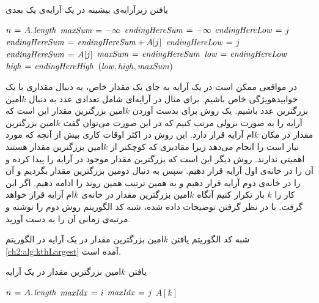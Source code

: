 \begin{algorithm}
\caption{یافتن زیرآرایه‌ی بیشینه‌ در یک آرایه‌ی یک بعدی}\label{ch2:alg:maxSubarray}
\begin{latin}
\begin{algorithmic}[1]
	\State	$n\mathrel{\hspace{1pt}=\hspace{1pt}} A.\hspace*{1pt}\mathit{\mathit{length}}$
	\State	$\mathit{maxSum}\mathrel{\hspace{1pt}=\hspace{1pt}} -\infty$
	\State	$\mathit{endingHereSum}\mathrel{\hspace{1pt}=\hspace{1pt}} -\infty$
		\State	$\mathit{endingHereLow}\mathrel{\hspace{1pt}=\hspace{1pt}} j$
			\State	$\mathit{endingHereSum}\mathrel{\hspace{1pt}=\hspace{1pt}} \mathit{endingHereSum} + A[j]$
		\Else
			\State	$\mathit{endingHereLow}\mathrel{\hspace{1pt}=\hspace{1pt}} j$
			\State	$\mathit{endingHereSum}\mathrel{\hspace{1pt}=\hspace{1pt}} A[j]$
		\EndIf
			\State	$\mathit{maxSum}\mathrel{\hspace{1pt}=\hspace{1pt}} \mathit{endingHereSum}$
			\State	$\mathit{low}\mathrel{\hspace{1pt}=\hspace{1pt}} \mathit{endingHereLow}$
			\State	$\mathit{high}\mathrel{\hspace{1pt}=\hspace{1pt}} \mathit{endingHereHigh}$			
		\EndIf		
	\EndFor
	\State	\Return $(\mathit{low},\mathit{high},\mathit{maxSum})$
\EndFunction
\end{algorithmic}
\end{latin}
\end{algorithm}

 در مواقعی ممکن است در یک آرایه به جای یک مقدار خاص، به دنبال مقداری با یک ‌خوابیده{ویژگی} خاص باشیم. برای مثال در آرایه‌ای شامل تعدادی عدد به دنبال {$k$}امین بزرگترین عدد باشیم. یک روش برای بدست آوردن {$k$}امین بزرگترین مقدار این است که آرایه را به صورت نزولی مرتب کنیم که در این صورت می‌توان گفت {$k$}امین بزرگترین مقدار در مکان {$k$}ام آرایه قرار دارد. این روش در اکثر اوقات کاری بیش از آنچه که مورد نیاز است را انجام می‌دهد زیرا مقادیری که کوچکتر از {$k$}امین بزرگترین مقدار هستند اهمیتی ندارند. روش دیگر این است که بزرگترین مقدار موجود در آرایه را پیدا کرده و  آن را در خانه‌ی اول آرایه قرار دهیم. سپس به دنبال دومین بزرگترین مقدار بگردیم و آن را در خانه‌ی دوم آرایه قرار دهیم و به همین ترتیب همین روند را ادامه دهیم. اگر این کار را {$k$} بار تکرار کنیم آنگاه {$k$}امین بزرگترین مقدار در خانه‌ی {$k$}ام آرایه قرار خواهد گرفت. با در نظر گرفتن توضیحات داده ‌شده، شبه کد الگوریتم روش دوم را نوشته و مرتبه‌ی زمانی آن را به دست آورید.


شبه کد الگوریتم یافتن {$k$}امین بزرگترین مقدار در یک آرایه در الگوریتم {\ref{ch2:alg:kthLargest}} آمده است.

\begin{algorithm}
\caption{یافتن {$k$}امین بزرگترین مقدار در یک آرایه}\label{ch2:alg:kthLargest}
\begin{latin}
\begin{algorithmic}[1]
		\State	$n \mathrel{\hspace{1pt}=\hspace{1pt}} A.\hspace*{1pt}\mathit{length}$
				\State	$\mathit{maxIdx} \mathrel{\hspace{1pt}=\hspace{1pt}} i $
								\State	$\mathit{maxIdx} \mathrel{\hspace{1pt}=\hspace{1pt}} j$						
						\EndIf
				\EndFor
				\State	{}
		\EndFor
		\State	\Return $A[k]$
\EndFunction
\end{algorithmic}
\end{latin}
\end{algorithm}


